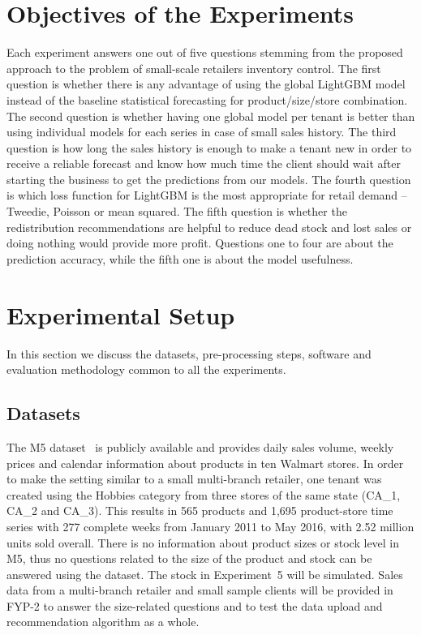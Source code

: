 \documentclass{StockSense}
\begin{document}
\section{Objectives of the Experiments}

Each experiment answers one out of five questions stemming from the proposed approach to the problem of small-scale retailers inventory control. The first question is whether there is any advantage of using the global LightGBM model instead of the baseline statistical forecasting for product/size/store combination. The second question is whether having one global model per tenant is better than using individual models for each series in case of small sales history. The third question is how long the sales history is enough to make a tenant new in order to receive a reliable forecast and know how much time the client should wait after starting the business to get the predictions from our models. The fourth question is which loss function for LightGBM is the most appropriate for retail demand – Tweedie, Poisson or mean squared. The fifth question is whether the redistribution recommendations are helpful to reduce dead stock and lost sales or doing nothing would provide more profit. Questions one to four are about the prediction accuracy, while the fifth one is about the model usefulness.

\section{Experimental Setup}

In this section we discuss the datasets, pre-processing steps, software and evaluation methodology common to all the experiments.

\subsection{Datasets}

The M5 dataset~\cite{makridakis2022m5} is publicly available and provides daily sales volume, weekly prices and calendar information about products in ten Walmart stores. In order to make the setting similar to a small multi-branch retailer, one tenant was created using the Hobbies category from three stores of the same state (CA\_1, CA\_2 and CA\_3). This results in 565 products and 1,695 product-store time series with 277 complete weeks from January 2011 to May 2016, with 2.52 million units sold overall. There is no information about product sizes or stock level in M5, thus no questions related to the size of the product and stock can be answered using the dataset. The stock in Experiment~5 will be simulated. Sales data from a multi-branch retailer and small sample clients will be provided in FYP-2 to answer the size-related questions and to test the data upload and recommendation algorithm as a whole.
\end{document}
